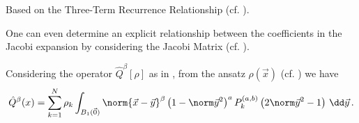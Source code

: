 Based on the Three-Term Recurrence Relationship (cf. ).

One can even determine an explicit relationship between the coefficients
in the Jacobi expansion by considering the Jacobi Matrix (cf. ).

Considering the operator $\hat{Q}^\beta[\rho]$ as in , from the ansatz $\rho(\vec{x})$ (cf. ) we have
$$\hat{Q}^{\beta}(x) = \sum_{k=1}^{N} \rho_{k} \int_{B_1(\vec{0})} \norm{\vec{x}-\vec{y}}^{\beta} \weight{y}\jacobi{y} \,\dd\vec{y}\,.$$
